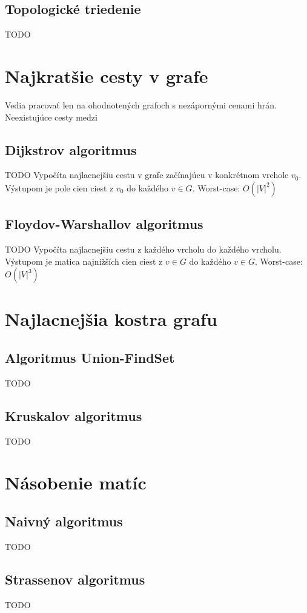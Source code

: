 	\subsection{Topologické triedenie} TODO

\section{Najkratšie cesty v grafe}
	Vedia pracovať len na ohodnotených grafoch s nezápornými cenami hrán. Neexistujúce cesty medzi 
	\subsection{Dijkstrov algoritmus} TODO
		Vypočíta najlacnejšiu cestu v grafe začínajúcu v konkrétnom vrchole $v_{0}$. Výstupom je pole cien ciest z $v_{0}$ do každého $v \in G$.
		Worst-case: $O(|V|^{2})$
	\subsection{Floydov-Warshallov algoritmus} TODO
		Vypočíta najlacnejšiu cestu z každého vrcholu do každého vrcholu. Výstupom je matica najnižších cien ciest z $v \in G$ do každého $v \in G$.
		Worst-case: $O(|V|^{3})$

\section{Najlacnejšia kostra grafu}

	\subsection{Algoritmus Union-FindSet} TODO

	\subsection{Kruskalov algoritmus} TODO

\section{Násobenie matíc}

	\subsection{Naivný algoritmus} TODO
	\subsection{Strassenov algoritmus} TODO
